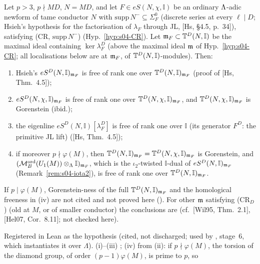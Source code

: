 \begin{theorem}\label{thm:s04-Gor}
Let $p>3$, $p\nmid MD$, $N=MD$, and let $F\in eS(N,\chi,\mathbb I)$ be an ordinary $\Lambda$-adic newform of tame conductor $N$ with
$\mathrm{supp}\,N^-\subseteq\Sigma^0_F$ (discrete series at every $\ell\mid D$; Hsieh's hypothesis for the factorisation of
$\lambda_F$ through JL, [Hs, \S4.5, p.~34]), satisfying (CR, $\mathrm{supp}\,N^-$) (Hyp.~\ref{hyp:s04-CR}). Let $\mathfrak{m}_F\subset\mathbb{T}^D(N,\mathbb I)$
be the maximal ideal containing $\ker\lambda^D_F$ (above the maximal ideal $\mathfrak{m}$ of Hyp.~\ref{hyp:s04-CR}; all localisations below are
at $\mathfrak{m}_F$, of $\mathbb{T}^D(N,\mathbb I)$-modules). Then:
\begin{enumerate}[label=(\roman*)]
\item Hsieh's $eS^D(N,\mathbb I)_{\mathfrak{m}_F}$ is free of rank one over $\mathbb{T}^D(N,\mathbb I)_{\mathfrak{m}_F}$ (proof of [Hs, Thm.~4.5]);
\item $eS^D(N,\chi,\mathbb I)_{\mathfrak{m}_F}$ is free of rank one over $\mathbb{T}^D(N,\chi,\mathbb I)_{\mathfrak{m}_F}$, and $\mathbb{T}^D(N,\chi,\mathbb I)_{\mathfrak{m}_F}$ is
  Gorenstein (ibid.);
\item the eigenline $eS^D(N,\mathbb I)[\lambda^D_F]$ is free of rank one over $\mathbb I$ (its generator $F^D$: the primitive JL lift)
  ([Hs, Thm.~4.5]);
\item if moreover $p\nmid\varphi(M)$, then $\mathbb{T}^D(N,\mathbb I)_{\mathfrak{m}_F}=\mathbb{T}^D(N,\chi,\mathbb I)_{\mathfrak{m}_F}$ is Gorenstein, and
  $(\mathcal{M}^{\mathrm{ord}}_B(U_1(M))\otimes_\Lambda\mathbb I)_{\mathfrak{m}_F}$, which is the $\iota_2$-twisted $\mathbb I$-dual of $eS^D(N,\mathbb I)_{\mathfrak{m}_F}$
  (Remark~\ref{rem:s04-iota2}), is free of rank one over $\mathbb{T}^D(N,\mathbb I)_{\mathfrak{m}_F}$.
\end{enumerate}
If $p\mid\varphi(M)$, Gorenstein-ness of the full $\mathbb{T}^D(N,\mathbb I)_{\mathfrak{m}_F}$ and the homological freeness in (iv) are not cited and
not proved here (\stexp). For other $\mathfrak{m}$ satisfying (CR$_D$) (old at $M$, or of smaller conductor) the conclusions are \stexp{}
(cf.\ [Wil95, Thm.~2.1], [Hel07, Cor.~8.11]; not checked here).
\end{theorem}
\noindent Registered in Lean as the hypothesis  (cited, not discharged; used by , stage~6, which instantiates it over $\Lambda$).
\noindent\stcited{} (i)--(iii) ;
(iv) \stproved{} from (ii): if $p\nmid\varphi(M)$, the torsion of the diamond group, of order $(p-1)\varphi(M)$, is prime to $p$, so

